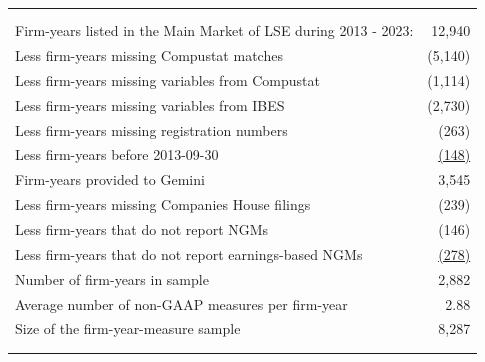 \begin{tabular}{ l r}\\[-1.8ex]\hline \hline \\[-4.2ex]\\Firm-years listed in the Main Market of LSE during 2013 - 2023: &12,940\\ \quad Less firm-years missing Compustat matches &(5,140)\\ \quad Less firm-years missing variables from Compustat &(1,114)\\ \quad Less firm-years missing variables from IBES &(2,730)\\ \quad Less firm-years missing registration numbers &(263)\\ \quad Less firm-years before 2013-09-30 &\underline{(148)}\\ Firm-years provided to Gemini &3,545\\ \quad Less firm-years missing Companies House filings &(239)\\ \quad Less firm-years that do not report NGMs &(146)\\ \quad Less firm-years that do not report earnings-based NGMs &\underline{(278)}\\ Number of firm-years in sample &2,882\\ Average number of non-GAAP measures per firm-year &2.88\\Size of the firm-year-measure sample &8,287\\\\[-3.0ex]\hline \hline \\[-1.8ex]\end{tabular}